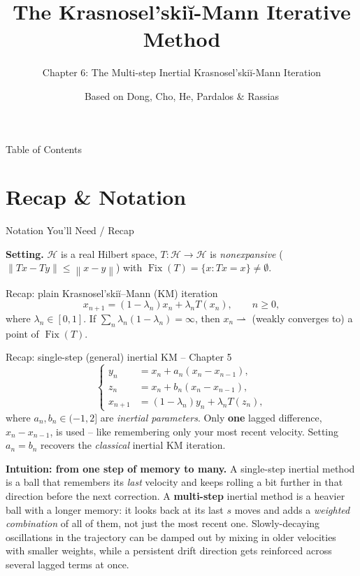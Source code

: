 \documentclass[aspectratio=169,10pt]{beamer}
\title[KM Method -- Ch.6]{The Krasnosel'ski\u{i}-Mann Iterative Method}
\subtitle{Chapter 6: The Multi-step Inertial Krasnosel'ski\u{i}-Mann Iteration}
\author{Based on Dong, Cho, He, Pardalos \& Rassias}
\date{}
\newcommand{\Hil}{\mathcal{H}}
\newcommand{\norm}[1]{\left\|#1\right\|}
\newcommand{\Fix}{\operatorname{Fix}}
\begin{document}
\begin{frame}
  \titlepage
\end{frame}

\begin{frame}{Table of Contents}
  \tableofcontents
\end{frame}

\section{Recap \& Notation}

\begin{frame}[allowframebreaks]{Notation You'll Need / Recap}

\textbf{Setting.} $\Hil$ is a real Hilbert space, $T:\Hil\to\Hil$ is
\emph{nonexpansive} ($\norm{Tx-Ty}\le\norm{x-y}$) with $\Fix(T)=\{x: Tx=x\}\ne\emptyset$.

\begin{block}{Recap: plain Krasnosel'ski\u{i}--Mann (KM) iteration}
\[x_{n+1} = (1-\lambda_n)x_n + \lambda_n T(x_n), \qquad n\ge 0,\]
where $\lambda_n\in[0,1]$. If $\sum_n \lambda_n(1-\lambda_n)=\infty$, then
$x_n \rightharpoonup$ (weakly converges to) a point of $\Fix(T)$.
\end{block}

\begin{block}{Recap: single-step (general) inertial KM -- Chapter 5}
\[
\left\{
\begin{aligned}
y_n &= x_n + a_n (x_n - x_{n-1}), \\
z_n &= x_n + b_n (x_n - x_{n-1}), \\
x_{n+1} &= (1-\lambda_n) y_n + \lambda_n T(z_n),
\end{aligned}
\right.
\]
where $a_n, b_n \in (-1,2]$ are \emph{inertial parameters}. Only \textbf{one}
lagged difference, $x_n - x_{n-1}$, is used -- like remembering only your
most recent velocity. Setting $a_n=b_n$ recovers the \emph{classical}
inertial KM iteration.
\end{block}

\framebreak

\textbf{Intuition: from one step of memory to many.} A single-step inertial
method is a ball that remembers its \emph{last} velocity and keeps rolling a
bit further in that direction before the next correction. A
\textbf{multi-step} inertial method is a heavier ball with a longer memory:
it looks back at its last $s$ moves and adds a \emph{weighted combination}
of all of them, not just the most recent one. Slowly-decaying oscillations
in the trajectory can be damped out by mixing in older velocities with
smaller weights, while a persistent drift direction gets reinforced across
several lagged terms at once.


\end{frame}
\end{document}
